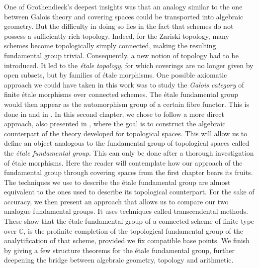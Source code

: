 \documentclass{article}
\theoremstyle{plain}
\theoremstyle{definition}
\begin{document}


One of Grothendieck’s deepest insights was that an analogy similar to the one between Galois theory and covering spaces could be transported into algebraic geometry.
But the difficulty in doing so lies in the fact that schemes do not possess a sufficiently rich topology. 
Indeed, for the Zariski topology, many schemes become topologically simply connected, making the resulting fundamental group trivial.
Consequently, a new notion of topology had to be introduced. 
It led to the \textit{\'etale topology}, for which coverings are no longer given by open subsets, but by families of \'etale morphisms.
One possible axiomatic approach we could have taken in this work was to study the \textit{Galois category} of finite \'etale morphisms over connected schemes. 
The \'etale fundamental group would then appear as the automorphism group of a certain fibre functor. 
This is done in \cite{SGA} and in \cite{Lenstra}.
In this second chapter, we chose to follow a more direct approach, also presented in \cite{Szamuely},
where the goal is to construct the algebraic counterpart of the theory developed for topological spaces.
This will allow us to define an object analogous to the fundamental group of topological spaces called the \textit{\'etale fundamental group}.
This can only be done after a thorough investigation of \'etale morphisms.
Here the reader will contemplate how our approach of the fundamental group through covering spaces from the first chapter bears its fruits.
The techniques we use to describe the \'etale fundamental group are almost equivalent to the ones used to describe its topological counterpart.
For the sake of accuracy, we then present an approach that allows us to compare our two analogue fundamental groups.
It uses techniques called transcendental methods. 
These show that the \'etale fundamental group of a connected scheme of finite type over $\mathbb{C}$, is the profinite completion of the topological fundamental group of the analytification of that scheme, provided we fix compatible base points.
We finish by giving a few structure theorems for the \'etale fundamental group, further deepening the bridge between algebraic geometry, topology and arithmetic.\\
\end{document}
